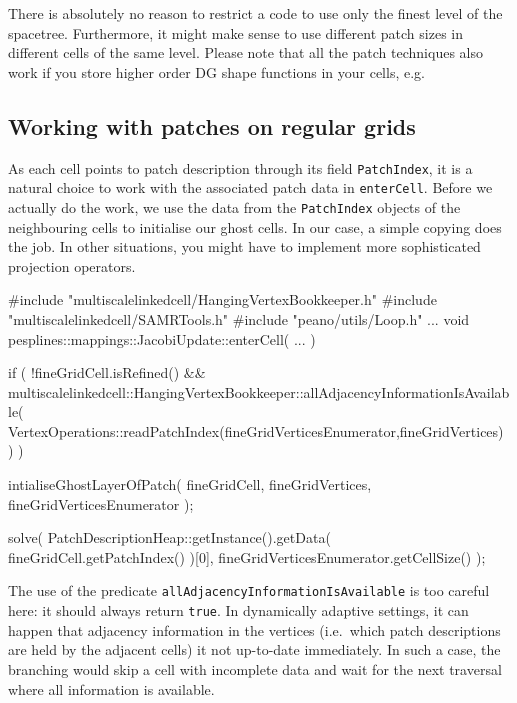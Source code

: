 \begin{remark}
  There is absolutely no reason to restrict a code to use only the finest level
  of the spacetree. Furthermore, it might make sense to use different patch
  sizes in different cells of the same level. Please note that all the patch
  techniques also work if you store higher order DG shape functions in your
  cells, e.g.
\end{remark}



\subsection{Working with patches on regular grids}

As each cell points to patch description through its field \texttt{PatchIndex},
it is a natural choice to work with the associated patch data in
\texttt{enterCell}.
Before we actually do the work, we use the data from the 
\texttt{PatchIndex} objects of the neighbouring cells to initialise our ghost
cells.
In our case, a simple copying does the job. In other situations, you might have
to implement more sophisticated projection operators.

\begin{code}
#include "multiscalelinkedcell/HangingVertexBookkeeper.h"
#include "multiscalelinkedcell/SAMRTools.h"
#include "peano/utils/Loop.h"
...
void pesplines::mappings::JacobiUpdate::enterCell( ... ) {
 if (
  !fineGridCell.isRefined()
  &&
  multiscalelinkedcell::HangingVertexBookkeeper::allAdjacencyInformationIsAvailable(
   VertexOperations::readPatchIndex(fineGridVerticesEnumerator,fineGridVertices)
  )
 ) {
  intialiseGhostLayerOfPatch(
    fineGridCell,
    fineGridVertices,
    fineGridVerticesEnumerator
  );
   
  solve(
    PatchDescriptionHeap::getInstance().getData( fineGridCell.getPatchIndex() )[0],
    fineGridVerticesEnumerator.getCellSize()
  );
 }  
}
\end{code}

\noindent
The use of the predicate \texttt{allAdjacencyInformationIsAvailable} is too
careful here: it should always return \texttt{true}.
In dynamically adaptive settings, it can happen that adjacency information in
the vertices (i.e.~which patch descriptions are held by the adjacent cells) it
not up-to-date immediately.
In such a case, the branching would skip a cell with incomplete data and wait
for the next traversal where all information is available.


